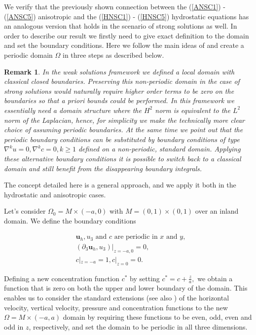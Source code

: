 \documentclass[11pt, a4paper]{article}
\newtheorem{remark}{Remark}
\begin{document}
We verify that the previously shown connection between the (\ref{ANSC1}) - (\ref{ANSC5}) anisotropic and the (\ref{HNSC1}) - (\ref{HNSC5}) hydrostatic equations has an analogous version that holds in the scenario of strong solutions as well. In order to describe our result we firstly need to give exact definition to the domain and set the boundary conditions. Here we follow the main ideas of \cite{cao2014local} and create a periodic domain $\Omega$ in three steps as described below.

\begin{remark}
\normalfont In the weak solutions framework we defined a local domain with classical closed boundaries. Preserving this non-periodic domain in the case of strong solutions would naturally require higher order terms to be zero on the boundaries so that a priori bounds could be performed.
In this framework we essentially need a domain structure where the $H^2$ norm is equivalent to the $L^2$ norm of the Laplacian, hence, for simplicity we make the technically more clear choice of assuming periodic boundaries. At the same time we point out that the periodic boundary conditions can be substituted by boundary conditions of type $\nabla^k u = 0, \nabla^k c = 0, k \geq 1$ defined on a non-periodic, standard domain. Applying these alternative boundary conditions it is possible to switch back to a classical domain and still benefit from the disappearing boundary integrals.
\end{remark}

The concept detailed here is a general approach, and we apply it both in the hydrostatic and anisotropic cases.

Let's consider $\Omega_0 = M \times (-a, 0)$ with $M = (0,1) \times (0,1)$ over an inland domain. We define the boundary conditions

\begin{equation}
\begin{split}
& \mathbf{u}_h, u_3 \text{ and } c \text{ are periodic in } x \text{ and } y, \\
& (\partial_3 \mathbf{u}_h, u_3) | _{z = -a, 0} = 0, \\
& c |_{z = -a} = 1, c |_{z = 0} = 0.
\end{split}
\end{equation}

Defining a new concentration function $c^*$ by setting $c^* = c + \frac{z}{a},$ we obtain a function that is zero on both the upper and lower boundary of the domain. This enables us to consider the standard extensions (see also \cite{li2019primitive}) of the horizontal velocity, vertical velocity, pressure and concentration functions to the new $\Omega = M \times (-a, a)$ domain by requiring these functions to be even, odd, even and odd in $z$, respectively, and set the domain to be periodic in all three dimensions.
\end{document}
